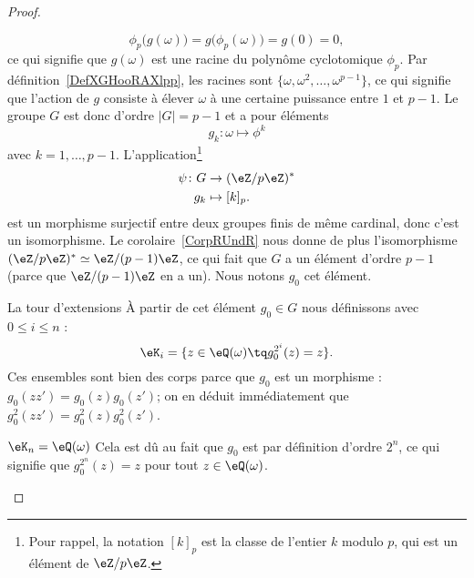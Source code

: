 \begin{proof}
\begin{subproof}
\begin{subproof}
                    \begin{equation}
                        \phi_p\big( g(\omega) \big)=g\big( \phi_p(\omega) \big)=g(0)=0,
                    \end{equation}
                    ce qui signifie que \( g(\omega)\) est une racine du polynôme cyclotomique \( \phi_p\). Par définition~\ref{DefXGHooRAXlpp}, les racines sont \( \{ \omega,\omega^2,\ldots, \omega^{p-1} \}\), ce qui signifie que l'action de \( g\) consiste à élever \( \omega\) à une certaine puissance entre \( 1\) et \( p-1\). Le groupe \( G\) est donc d'ordre \( | G |=p-1\) et a pour éléments
                    \begin{equation}
                        g_k\colon \omega\mapsto \phi^k
                    \end{equation}
                    avec \( k=1,\ldots, p-1\). L'application\footnote{Pour rappel, la notation \( [k]_p\) est la classe de l'entier \( k\) modulo \( p\), qui est un élément de \( \eZ/p\eZ\).}
                    \begin{equation}
                        \begin{aligned}
                            \psi\colon G&\to (\eZ/p\eZ)^* \\
                            g_k&\mapsto [k]_p .
                        \end{aligned}
                    \end{equation}
                    est un morphisme surjectif entre deux groupes finis de même cardinal, donc c'est un isomorphisme. Le corolaire~\ref{CorpRUndR} nous donne de plus l'isomorphisme \( (\eZ/p\eZ)^*\simeq \eZ/(p-1)\eZ\), ce qui fait que \( G\) a un élément d'ordre \( p-1\) (parce que \( \eZ/(p-1)\eZ\) en a un). Nous notons \( g_0\) cet élément.
                \item[La tour d'extensions]
                    À partir de cet élément \( g_0\in G\) nous définissons avec \( 0\leq i\leq n\) :
                    \begin{equation}
                        \eK_i=\{ z\in \eQ(\omega)\tq g_0^{2^i}(z)=z \}.
                    \end{equation}
                    Ces ensembles sont bien des corps parce que \( g_0\) est un morphisme : \( g_0(zz')=g_0(z)g_0(z')\); on en déduit immédiatement que \( g_0^2(zz')=g_0^2(z)g_0^2(z')\).
                \item[\( \eK_n=\eQ(\omega)\)]
                    Cela est dû au fait que \( g_0\) est par définition d'ordre \( 2^n\), ce qui signifie que \( g_0^{2^n}(z)=z\) pour tout \( z\in \eQ(\omega)\).

\end{subproof}
\end{subproof}
\end{proof}
